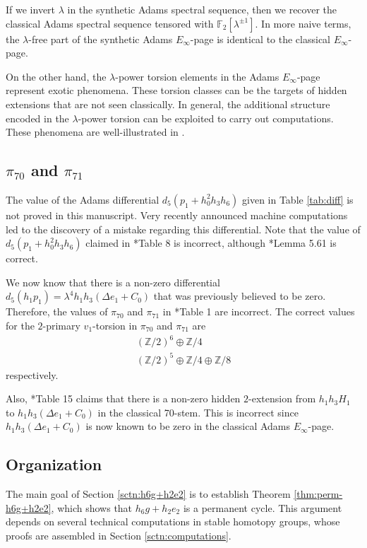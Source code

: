\documentclass{amsart}
\theoremstyle{definition}
\newcommand{\F}{\mathbb{F}}
\newcommand{\Z}{\mathbb{Z}}
\newcommand{\D}{\Delta}
\begin{document}
If we invert $\lambda$ in the synthetic Adams spectral sequence,
then we recover the classical Adams spectral sequence tensored with
$\F_2[\lambda^{\pm 1}]$.  In more naive terms, the
$\lambda$-free part of the synthetic Adams $E_\infty$-page is
identical to the classical $E_\infty$-page.

On the other hand, the $\lambda$-power torsion elements in the Adams
$E_\infty$-page represent exotic phenomena.  These torsion classes
can be the targets of 
hidden extensions that are not seen classically.
In general, the additional structure encoded in the $\lambda$-power
torsion can be exploited to carry out computations.
These phenomena are well-illustrated in \cite{Burklund21} \cite{BX} \cite{Marek} \cite{BJM24}.

\subsection{$\pi_{70}$ and $\pi_{71}$}

The value of the Adams differential $d_5(p_1 + h_0^2 h_3 h_6)$
given in Table \ref{tab:diff} is not proved in this manuscript.  
Very recently announced machine computations \cite{LWX} led to the
discovery of a mistake regarding this differential.
Note that the value of $d_5(p_1 + h_0^2 h_3 h_6)$ claimed in
\cite{IWX}*{Table 8} is incorrect, 
although \cite{IWX}*{Lemma 5.61} is correct.

We now know that there is a non-zero differential
$d_5(h_1 p_1) = \lambda^4 h_1 h_3 (\D e_1 + C_0)$
that was previously believed to be zero.  
Therefore, the values of $\pi_{70}$ and $\pi_{71}$ in
\cite{IWX}*{Table 1} are incorrect.  The correct values for
the $2$-primary $v_1$-torsion in $\pi_{70}$ and $\pi_{71}$ are
\begin{gather*}
(\Z/2)^6 \oplus \Z/4 \\
(\Z/2)^5 \oplus \Z/4 \oplus \Z/8
\end{gather*}
respectively.

Also, \cite{IWX}*{Table 15} claims that there is a non-zero
hidden $2$-extension from $h_1 h_3 H_1$ to $h_1 h_3 (\D e_1 + C_0)$ 
in the classical 70-stem.  This is incorrect
since $h_1 h_3 (\D e_1 + C_0)$ is now known to be zero
in the classical Adams $E_\infty$-page.


\subsection{Organization}

The main goal of Section \ref{sctn:h6g+h2e2} is to establish
Theorem \ref{thm:perm-h6g+h2e2}, which shows that 
$h_6 g + h_2 e_2$ is a permanent cycle.  This argument depends on
several technical computations in stable homotopy groups, whose
proofs are assembled in Section \ref{sctn:computations}.
\end{document}
